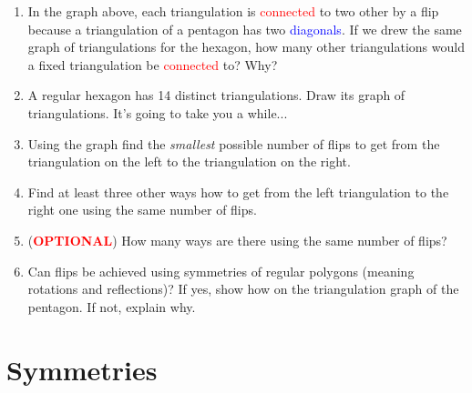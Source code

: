 \documentclass[a4paper,11pt]{article}
\newcommand{\clr}{\textcolor{red}}
\newcommand{\clb}{\textcolor{blue}}
\begin{document}
\begin{enumerate}
 \item In the graph above, each triangulation is \clr{connected} to two other by
  a flip because a triangulation of a pentagon has two \clb{diagonals}. If we
  drew the same graph of triangulations for the hexagon, how many other
  triangulations would a fixed triangulation be \clr{connected} to? Why?
 \item A regular hexagon has 14 distinct triangulations. Draw its graph of
  triangulations. It's going to take you a while...
 \item Using the graph find the \emph{smallest} possible number of flips to get
  from the triangulation on the left to the triangulation on the right.
  \begin{center}
  \end{center}
 \item Find at least three other ways how to get from the left triangulation to
  the right one using the same number of flips.
 \item (\clr{\textbf{OPTIONAL}}) How many ways are there using the same number
  of flips?
 \item Can flips be achieved using symmetries of regular polygons (meaning
  rotations and reflections)? If yes, show how on the triangulation graph of the
  pentagon. If not, explain why.
\end{enumerate}

\section*{Symmetries}
\end{document}
